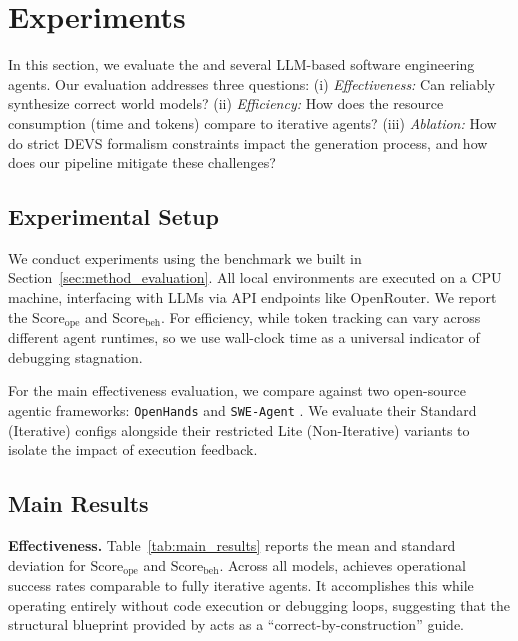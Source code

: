 \section{Experiments}
\label{sec:experiments}

In this section, we evaluate the \methodname{} and several LLM-based software engineering agents. Our evaluation addresses three questions: (i) \emph{Effectiveness:} Can \methodname{} reliably synthesize correct world models? (ii) \emph{Efficiency:} How does the resource consumption (time and tokens) compare to iterative agents? (iii) \emph{Ablation:} How do strict DEVS formalism constraints impact the generation process, and how does our pipeline mitigate these challenges?

\subsection{Experimental Setup}

We conduct experiments using the benchmark we built in Section~\ref{sec:method_evaluation}. All local environments are executed on a CPU machine, interfacing with LLMs via API endpoints like OpenRouter. We report the $\text{Score}_{\text{ope}}$ and $\text{Score}_{\text{beh}}$. For efficiency, while token tracking can vary across different agent runtimes, so we use wall-clock time as a universal indicator of debugging stagnation.

For the main effectiveness evaluation, we compare \methodname{} against two open-source agentic frameworks: \texttt{OpenHands} \cite{wang2025openhandssoftwareagentsdk} and \texttt{SWE-Agent} \cite{yang2024sweagent}. We evaluate their Standard (Iterative) configs alongside their restricted Lite (Non-Iterative) variants to isolate the impact of execution feedback.

\subsection{Main Results}

\noindent\textbf{Effectiveness.}
Table~\ref{tab:main_results} reports the mean and standard deviation for $\text{Score}_{\text{ope}}$ and $\text{Score}_{\text{beh}}$. Across all models, \methodname{} achieves operational success rates comparable to fully iterative agents. It accomplishes this while operating entirely without code execution or debugging loops, suggesting that the structural blueprint provided by \plantree{} acts as a ``correct-by-construction'' guide.

